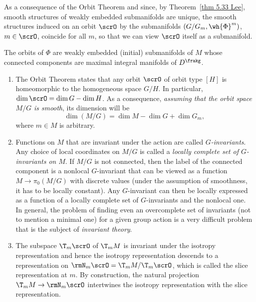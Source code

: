 As a consequence of the Orbit Theorem and since, by Theorem~\ref{thm 5.33 Lee}, smooth structures of weakly embedded submanifolds are unique, the smooth structures induced on an orbit $\scrO$ by the submanifolds $(G\slash G_m,\wh{\Phi}^m)$, $m\in \scrO$, coincide for all $m$, so that we can view $\scrO$ itself as a submanifold.  

\begin{cor}[{{\cite[Cor.~6.2.9]{RS1}}}]
    The orbits of $\Phi$ are weakly embedded (initial) submanifolds of $M$ whose connected components are maximal integral manifolds of $D^\frakg$.
\end{cor}

\begin{rem}[{{\cite[Rem.~6.2.10]{RS1}}}]\label{rem 6.2.10 RS1}
    \begin{enumerate}
        \item The Orbit Theorem states that any orbit $\scrO$ of orbit type $[H]$ is homeomorphic to the homogeneous space $G\slash H$. In particular, $\dim \scrO=\dim G-\dim H$. As a consequence, \emph{assuming that the orbit space $M\slash G$ is smooth}, its dimension will be 
        \[\dim (M\slash G)=\dim M-\dim G+\dim G_m,\] 
        where $m\in M$ is arbitrary. 
        
        \item Functions on $M$ that are invariant under the action are called \emph{$G$-invariants}. Any choice of local coordinates on $M\slash G$ is called a \emph{locally complete set of $G$-invariants on $M$}. If $M\slash G$ is not connected, then the label of the connected component is a nonlocal $G$-invariant that can be viewed as a function $M\to \pi_0(M\slash G)$ with discrete values (under the assumption of smoothness, it has to be locally constant). Any $G$-invariant can then be locally expressed as a function of a locally complete set of $G$-invariants and the nonlocal one. In general, the problem of finding even an overcomplete set of invariants (not to mention a minimal one) for a given group action is a very difficult problem that is the subject of \emph{invariant theory}.
        
        \item The subspace $\T_m\scrO$ of $\T_mM$ is invariant under the isotropy representation and hence the isotropy representation descends to a representation on $\rmN_m\scrO=\T_mM\slash \T_m\scrO$, which is called the slice representation at $m$. By construction, the natural projection $\T_mM\to \rmN_m\scrO$ intertwines the isotropy representation with the slice representation.


\end{enumerate}
\end{rem}
